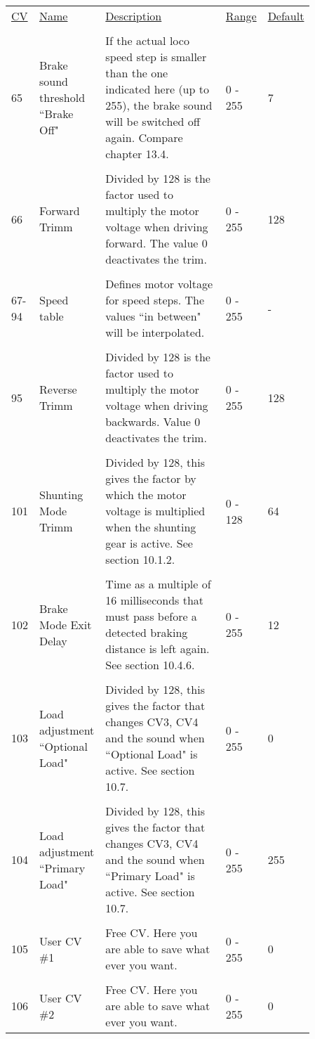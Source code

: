 \begin{tabular}{p{0.075\linewidth} p{0.15\linewidth} p{0.525\linewidth} p{0.06\linewidth} p{0.05\linewidth}} 
\underline{CV} & \underline{Name} &  \underline{Description} & \underline{Range} & \underline{Default}\\
\\
65 & Brake sound threshold ``Brake Off" & If the actual loco speed step is smaller than the one indicated here (up to 255), the brake sound will be switched off again. Compare chapter 13.4. & 0 - 255 & 7\\
\\
66 & Forward Trimm & Divided by 128 is the factor used to multiply the motor voltage when driving forward. The value 0 deactivates the trim. & 0 - 255 & 128\\
\\
67-94 & Speed table & Defines motor voltage for speed steps. The values ``in between" will be interpolated. & 0 - 255 & -\\
\\
95 & Reverse Trimm & Divided by 128 is the factor used to multiply the motor voltage when driving backwards. Value 0 deactivates the trim. & 0 - 255 & 128\\
\\
101 & Shunting Mode Trimm & Divided by 128, this gives the factor by which the motor voltage is multiplied when the shunting gear is active. See section 10.1.2. & 0 - 128 & 64\\
\\
102 & Brake Mode Exit Delay & Time as a multiple of 16 milliseconds that must pass before a detected braking distance is left again. See section 10.4.6. & 0 - 255 & 12\\
\\
103 & Load adjustment ``Optional Load" & Divided by 128, this gives the factor that changes CV3, CV4 and the sound when ``Optional Load" is active. See section 10.7. & 0 - 255 & 0\\
\\
104 & Load adjustment ``Primary Load" &  Divided by 128, this gives the factor that changes CV3, CV4 and the sound when ``Primary Load" is active. See section 10.7. & 0 - 255 & 255\\
\\
105 & User CV \#1 & Free CV. Here you are able to save what ever you want. & 0 - 255 & 0\\
\\
106 & User CV \#2 & Free CV. Here you are able to save what ever you want. & 0 - 255 & 0\\

\end{tabular}
